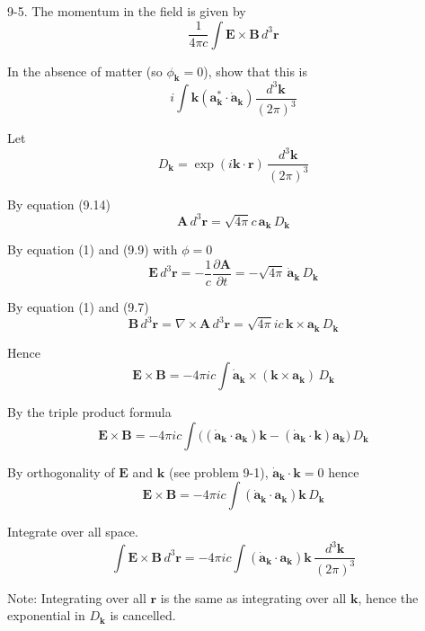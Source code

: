 \documentclass[12pt]{article}
\begin{document}
9-5.
The momentum in the field is given by
\begin{equation*}
\frac{1}{4\pi c}\int
\mathbf E\times\mathbf B\,d^3\mathbf r
\end{equation*}

In the absence of matter (so $\phi_{\mathbf k}=0$),
show that this is
\begin{equation*}
i\int\mathbf k\left(\mathbf a_{\mathbf k}^*\cdot\dot{\mathbf a}_{\mathbf k}\right)
\frac{d^3\mathbf k}{(2\pi)^3}
\end{equation*}

Let
\begin{equation*}
D_{\mathbf k}=\exp(i\mathbf k\cdot\mathbf r)\,\frac{d^3\mathbf k}{(2\pi)^3}
\end{equation*}

By equation (9.14)
\begin{equation*}
\mathbf A\,d^3\mathbf r=\sqrt{4\pi}c\,\mathbf a_{\mathbf k}\,D_{\mathbf k}
\tag{1}
\end{equation*}

By equation (1) and (9.9) with $\phi=0$
\begin{equation*}
\mathbf E\,d^3\mathbf r=-\frac{1}{c}\frac{\partial\mathbf A}{\partial t}
=-\sqrt{4\pi}\,\dot{\mathbf a}_{\mathbf k}\,D_{\mathbf k}
\end{equation*}

By equation (1) and (9.7)
\begin{equation*}
\mathbf B\,d^3\mathbf r=\nabla\times\mathbf A\,d^3\mathbf r
=\sqrt{4\pi}ic\,\mathbf k\times\mathbf a_{\mathbf k}\,D_{\mathbf k}
\end{equation*}

Hence
\begin{equation*}
\mathbf E\times\mathbf B=-4\pi ic\int
\dot{\mathbf a}_{\mathbf k}
\times\left(\mathbf k\times\mathbf a_{\mathbf k}\right)\,D_{\mathbf k}
\end{equation*}

By the triple product formula
\begin{equation*}
\mathbf E\times\mathbf B=-4\pi ic\int
\big(
(\dot{\mathbf a}_{\mathbf k}\cdot\mathbf a_{\mathbf k})\mathbf k
-(\dot{\mathbf a}_{\mathbf k}\cdot\mathbf k)\mathbf a_{\mathbf k}
\big)\,D_{\mathbf k}
\end{equation*}

By orthogonality of $\mathbf E$ and $\mathbf k$ (see problem 9-1),
$\dot{\mathbf a}_{\mathbf k}\cdot\mathbf k=0$ hence
\begin{equation*}
\mathbf E\times\mathbf B
=-4\pi ic\int(\dot{\mathbf a}_{\mathbf k}\cdot\mathbf a_{\mathbf k})\mathbf k
\,D_{\mathbf k}
\end{equation*}

Integrate over all space.
\begin{equation*}
\int\mathbf E\times\mathbf B
\,d^3\mathbf r
=-4\pi ic\int(\dot{\mathbf a}_{\mathbf k}\cdot\mathbf a_{\mathbf k})\mathbf k
\,\frac{d^3\mathbf k}{(2\pi)^3}
\end{equation*}

Note: Integrating over all $\mathbf r$ is the same as integrating over all $\mathbf k$,
hence the exponential in $D_{\mathbf k}$ is cancelled.
\end{document}
